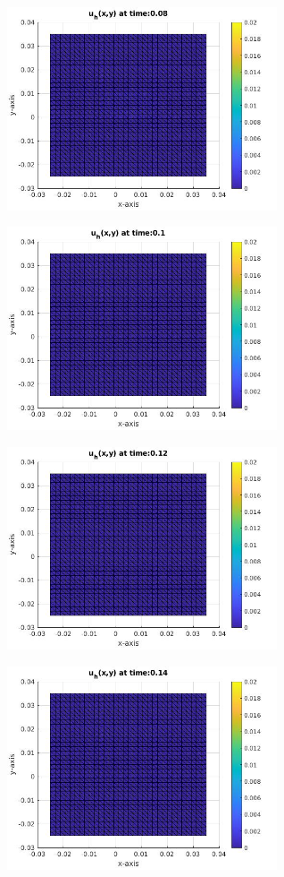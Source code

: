 \documentclass[a4paper,11pt]{article}
\begin{document}
\begin{figure}[h]
\begin{subfigure}{0.4\textwidth}
	\end{subfigure}
	\begin{subfigure}{0.4\textwidth}
		\includegraphics[width =8cm]{./tc1-1/008.jpg}
	\end{subfigure}
	\begin{subfigure}{0.4\textwidth}
		\includegraphics[width = 8cm]{./tc1-1/010.jpg}
	\end{subfigure}
	\begin{subfigure}{0.4\textwidth}
		\includegraphics[width =8cm]{./tc1-1/012.jpg}
	\end{subfigure}
	\begin{subfigure}{0.4\textwidth}
		\includegraphics[width = 8cm]{./tc1-1/014.jpg}

\end{subfigure}
\end{figure}
\end{document}
